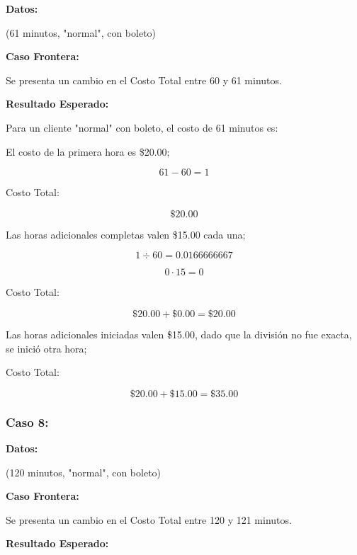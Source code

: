 \documentclass[11pt,letterpaper]{article}
\begin{document}
\textbf{Datos:}

(61 minutos, "normal", con boleto)

\textbf{Caso Frontera:}

Se presenta un cambio en el Costo Total entre 60 y 61 minutos.

\textbf{Resultado Esperado:}

Para un cliente "normal" con boleto, el costo de 61 minutos es:

El costo de la primera hora es \$20.00;

\[
   61 - 60 = 1
\]



Costo Total:

\[
   \text{\$}20.00
\]

\vspace{\baselineskip}
\vspace{\baselineskip}
\vspace{\baselineskip}
\vspace{\baselineskip}
\vspace{\baselineskip}

Las horas adicionales completas valen \$15.00 cada una;

\[
   1 \div 60 = 0.0166666667
\]

\[
   0 \cdot 15 = 0
\]



Costo Total:

\[
   \text{\$}20.00 + \text{\$}0.00 = \text{\$}20.00
\]

Las horas adicionales iniciadas valen \$15.00, dado que la división no fue exacta, se inició otra hora;



Costo Total:

\[
   \text{\$}20.00 + \text{\$}15.00 = \text{\$}35.00
\]


\subsubsection{Caso 8:}
\label{sec:orgecc7716}

\textbf{Datos:}

(120 minutos, "normal", con boleto)

\textbf{Caso Frontera:}

Se presenta un cambio en el Costo Total entre 120 y 121 minutos.

\textbf{Resultado Esperado:}
\end{document}
